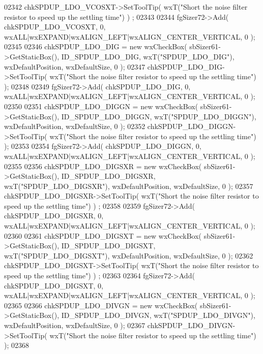 \begin{DoxyCode}
02342     chkSPDUP_LDO_VCOSXT->SetToolTip( wxT(\textcolor{stringliteral}{"Short the noise filter resistor to speed up the settling time"}) )
      ;
02343     
02344     fgSizer72->Add( chkSPDUP_LDO_VCOSXT, 0, wxALL|wxEXPAND|wxALIGN\_LEFT|wxALIGN\_CENTER\_VERTICAL, 0 );
02345     
02346     chkSPDUP_LDO_DIG = \textcolor{keyword}{new} wxCheckBox( sbSizer61->GetStaticBox(), 
      ID_SPDUP_LDO_DIG, wxT(\textcolor{stringliteral}{"SPDUP\_LDO\_DIG"}), wxDefaultPosition, wxDefaultSize, 0 );
02347     chkSPDUP_LDO_DIG->SetToolTip( wxT(\textcolor{stringliteral}{"Short the noise filter resistor to speed up the settling time"}) );
02348     
02349     fgSizer72->Add( chkSPDUP_LDO_DIG, 0, wxALL|wxEXPAND|wxALIGN\_LEFT|wxALIGN\_CENTER\_VERTICAL, 0 );
02350     
02351     chkSPDUP_LDO_DIGGN = \textcolor{keyword}{new} wxCheckBox( sbSizer61->GetStaticBox(), 
      ID_SPDUP_LDO_DIGGN, wxT(\textcolor{stringliteral}{"SPDUP\_LDO\_DIGGN"}), wxDefaultPosition, wxDefaultSize, 0 );
02352     chkSPDUP_LDO_DIGGN->SetToolTip( wxT(\textcolor{stringliteral}{"Short the noise filter resistor to speed up the settling time"}) );
02353     
02354     fgSizer72->Add( chkSPDUP_LDO_DIGGN, 0, wxALL|wxEXPAND|wxALIGN\_LEFT|wxALIGN\_CENTER\_VERTICAL, 0 );
02355     
02356     chkSPDUP_LDO_DIGSXR = \textcolor{keyword}{new} wxCheckBox( sbSizer61->GetStaticBox(), 
      ID_SPDUP_LDO_DIGSXR, wxT(\textcolor{stringliteral}{"SPDUP\_LDO\_DIGSXR"}), wxDefaultPosition, wxDefaultSize, 0 );
02357     chkSPDUP_LDO_DIGSXR->SetToolTip( wxT(\textcolor{stringliteral}{"Short the noise filter resistor to speed up the settling time"}) )
      ;
02358     
02359     fgSizer72->Add( chkSPDUP_LDO_DIGSXR, 0, wxALL|wxEXPAND|wxALIGN\_LEFT|wxALIGN\_CENTER\_VERTICAL, 0 );
02360     
02361     chkSPDUP_LDO_DIGSXT = \textcolor{keyword}{new} wxCheckBox( sbSizer61->GetStaticBox(), 
      ID_SPDUP_LDO_DIGSXT, wxT(\textcolor{stringliteral}{"SPDUP\_LDO\_DIGSXT"}), wxDefaultPosition, wxDefaultSize, 0 );
02362     chkSPDUP_LDO_DIGSXT->SetToolTip( wxT(\textcolor{stringliteral}{"Short the noise filter resistor to speed up the settling time"}) )
      ;
02363     
02364     fgSizer72->Add( chkSPDUP_LDO_DIGSXT, 0, wxALL|wxEXPAND|wxALIGN\_LEFT|wxALIGN\_CENTER\_VERTICAL, 0 );
02365     
02366     chkSPDUP_LDO_DIVGN = \textcolor{keyword}{new} wxCheckBox( sbSizer61->GetStaticBox(), 
      ID_SPDUP_LDO_DIVGN, wxT(\textcolor{stringliteral}{"SPDUP\_LDO\_DIVGN"}), wxDefaultPosition, wxDefaultSize, 0 );
02367     chkSPDUP_LDO_DIVGN->SetToolTip( wxT(\textcolor{stringliteral}{"Short the noise filter resistor to speed up the settling time"}) );
02368     

\end{DoxyCode}
